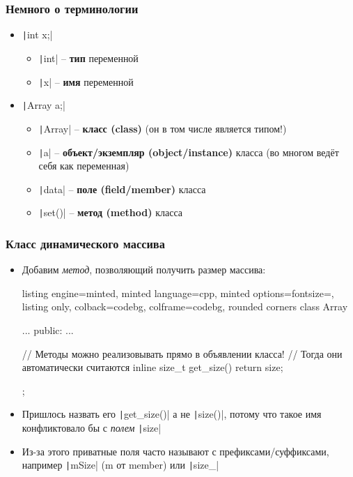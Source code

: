 \documentclass[10pt]{beamer}
\begin{document}
\begin{frame}[fragile]
\frametitle{Немного о терминологии}
\begin{itemize}
\item \texttt|int x;|
\pause
\begin{itemize}
\item \texttt|int| -- \textbf{тип} переменной
\item \texttt|x| -- \textbf{имя} переменной
\end{itemize}
\pause
\item \texttt|Array a;|
\pause
\begin{itemize}
\item \texttt|Array| -- \textbf{класс (class)} (он в том числе является типом!)
\item \texttt|a| -- \textbf{объект/экземпляр (object/instance)} класса (во многом ведёт себя как переменная)
\item \texttt|data| -- \textbf{поле (field/member)} класса
\item \texttt|set()| -- \textbf{метод (method)} класса
\end{itemize}
\end{itemize}
\end{frame}

\begin{frame}[fragile]
\frametitle{Класс динамического массива}
\begin{itemize}
\item Добавим \textit{метод}, позволяющий получить размер массива:
\pause
\begin{tcblisting}{listing engine=minted, minted language=cpp, minted options={fontsize=\scriptsize}, listing only, colback=codebg, colframe=codebg, rounded corners}
class Array {
...
public:
  ...

  // Методы можно реализовывать прямо в объявлении класса!
  // Тогда они автоматически считаются inline
  size_t get_size() {
    return size;
  }
};
\end{tcblisting}
\pause
{}
\item Пришлось назвать его \texttt|get_size()| а не \texttt|size()|, потому что такое имя конфликтовало бы с \textit{полем} \texttt|size|
\pause
\item Из-за этого приватные поля часто называют с префиксами/суффиксами, например \texttt|mSize| (m от member) или \texttt|size_|
\end{itemize}
\end{frame}
\end{document}
